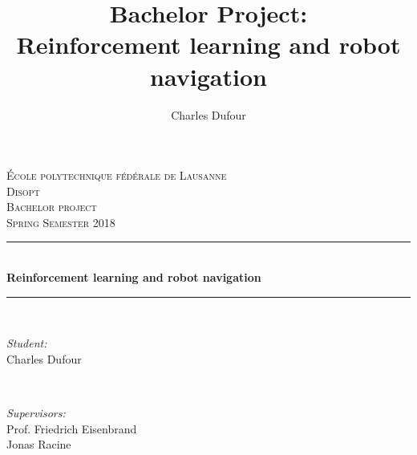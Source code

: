 \documentclass[14pt,a4paper]{article}
\author{Charles Dufour}
\title{Bachelor Project: \\
Reinforcement learning and robot navigation}
\theoremstyle{definition}
\begin{document}
\begin{titlepage}
\newcommand{\HRule}{\rule{\linewidth}{0.5mm}} %

\center %
 

\vspace{3cm}
\textsc{\LARGE \'Ecole polytechnique f\'ed\'erale de Lausanne}\\[0.5cm] %
\textsc{\large Disopt}\\[1.5cm] %
\textsc{\LARGE Bachelor project}\\[0.5cm] %
\textsc{\large Spring Semester 2018 }\\[0.5cm] %


\HRule \\[0.4cm]
{ \huge \bfseries Reinforcement learning and robot navigation}\\[0.4cm] %
\HRule \\[1.5cm]
 

\begin{minipage}{0.4\textwidth}
\begin{flushleft} \large
\emph{Student:}\\
Charles Dufour
\end{flushleft}
\end{minipage}
~
\begin{minipage}{0.4\textwidth}
\begin{flushright} \large
\emph{Supervisors:} \\
Prof. Friedrich Eisenbrand \\%
Jonas Racine
\end{flushright}
\end{minipage}\\[5cm]


\end{titlepage}
\end{document}
